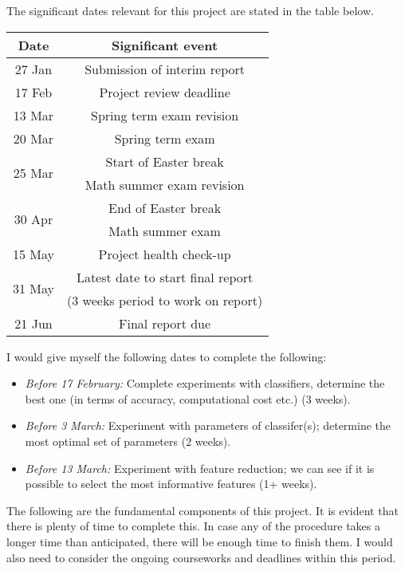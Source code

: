 \documentclass[12pt, twoside, a4paper]{article}
\begin{document}
The significant dates relevant for this project are stated in the table below.

\begin{center}
    \begin{tabular}{ | c | c |}
    \hline
    Date & Significant event \\ \hline \hline
    27 Jan & Submission of interim report \\ \hline
    17 Feb & Project review deadline \\ \hline \hline
    13 Mar & Spring term exam revision \\ \hline
    20 Mar & Spring term exam \\ \hline \hline
    \multirow{2}{*}{25 Mar} & Start of Easter break \\
    & Math summer exam revision \\ \hline
    \multirow{2}{*}{30 Apr} & End of Easter break \\
     & Math summer exam \\ \hline \hline
    15 May & Project health check-up \\ \hline
    \multirow{2}{*}{31 May} & Latest date to start final report \\
    & (3 weeks period to work on report) \\ \hline
    21 Jun & Final report due \\
    \hline
    \end{tabular}
\end{center}

I would give myself the following dates to complete the following:
\begin{itemize}
\item \textit{Before 17 February:} Complete experiments with classifiers, determine the best one (in terms of accuracy, computational cost etc.) (3 weeks).
\item \textit{Before 3 March:} Experiment with parameters of classifer(s); determine the most optimal set of parameters (2 weeks).
\item \textit{Before 13 March:} Experiment with feature reduction; we can see if it is possible to select the most informative features (1+ weeks).
\end{itemize}

The following are the fundamental components of this project. It is evident that there is plenty of time to complete this. In case any of the procedure takes a longer time than anticipated, there will be enough time to finish them. I would also need to consider the ongoing courseworks and deadlines within this period.
\end{document}
